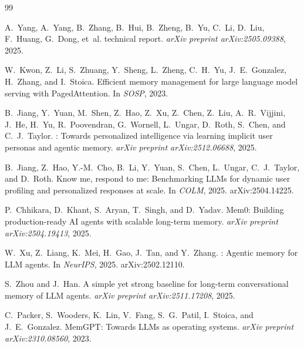 \documentclass[sigconf,review,anonymous]{acmart}
\begin{document}


\begingroup
\footnotesize
\begin{thebibliography}{99}
\setlength{\itemsep}{0pt}
\setlength{\parskip}{0pt}

A.~Yang, A.~Yang, B.~Zhang, B.~Hui, B.~Zheng, B.~Yu, C.~Li, D.~Liu, F.~Huang, G.~Dong, et~al.
 technical report.
\newblock \textit{arXiv preprint arXiv:2505.09388}, 2025.

W.~Kwon, Z.~Li, S.~Zhuang, Y.~Sheng, L.~Zheng, C.~H.~Yu, J.~E.~Gonzalez, H.~Zhang, and I.~Stoica.
\newblock Efficient memory management for large language model serving with {PagedAttention}.
\newblock In \textit{SOSP}, 2023.

B.~Jiang, Y.~Yuan, M.~Shen, Z.~Hao, Z.~Xu, Z.~Chen, Z.~Liu, A.~R.~Vijjini, J.~He, H.~Yu, R.~Poovendran, G.~Wornell, L.~Ungar, D.~Roth, S.~Chen, and C.~J.~Taylor.
: Towards personalized intelligence via learning implicit user personas and agentic memory.
\newblock \textit{arXiv preprint arXiv:2512.06688}, 2025.

B.~Jiang, Z.~Hao, Y.-M.~Cho, B.~Li, Y.~Yuan, S.~Chen, L.~Ungar, C.~J.~Taylor, and D.~Roth.
\newblock Know me, respond to me: Benchmarking {LLMs} for dynamic user profiling and personalized responses at scale.
\newblock In \textit{COLM}, 2025. arXiv:2504.14225.

P.~Chhikara, D.~Khant, S.~Aryan, T.~Singh, and D.~Yadav.
\newblock Mem0: Building production-ready {AI} agents with scalable long-term memory.
\newblock \textit{arXiv preprint arXiv:2504.19413}, 2025.

W.~Xu, Z.~Liang, K.~Mei, H.~Gao, J.~Tan, and Y.~Zhang.
: Agentic memory for {LLM} agents.
\newblock In \textit{NeurIPS}, 2025. arXiv:2502.12110.

S.~Zhou and J.~Han.
\newblock A simple yet strong baseline for long-term conversational memory of {LLM} agents.
\newblock \textit{arXiv preprint arXiv:2511.17208}, 2025.

C.~Packer, S.~Wooders, K.~Lin, V.~Fang, S.~G.~Patil, I.~Stoica, and J.~E.~Gonzalez.
\newblock MemGPT: Towards {LLMs} as operating systems.
\newblock \textit{arXiv preprint arXiv:2310.08560}, 2023.


\end{thebibliography}
\end{document}
